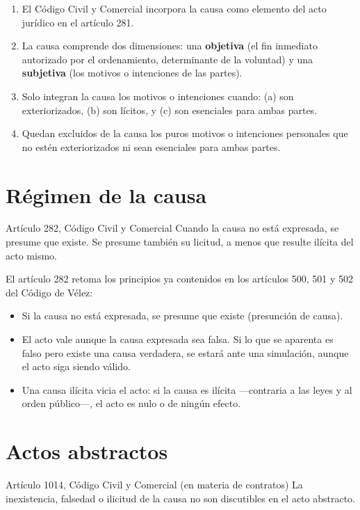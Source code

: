 \documentclass[12pt,oneside]{book}
\begin{document}
\begin{enumerate}
    \item El Código Civil y Comercial incorpora la causa como elemento del acto jurídico en el artículo 281.
    \item La causa comprende dos dimensiones: una \textbf{objetiva} (el fin inmediato autorizado por el ordenamiento, determinante de la voluntad) y una \textbf{subjetiva} (los motivos o intenciones de las partes).
    \item Solo integran la causa los motivos o intenciones cuando: (a) son exteriorizados, (b) son lícitos, y (c) son esenciales para ambas partes.
    \item Quedan excluidos de la causa los puros motivos o intenciones personales que no estén exteriorizados ni sean esenciales para ambas partes.
\end{enumerate}

\section{Régimen de la causa}

\begin{definition}{Artículo 282, Código Civil y Comercial}
Cuando la causa no está expresada, se presume que existe. Se presume también su licitud, a menos que resulte ilícita del acto mismo.
\end{definition}

El artículo 282 retoma los principios ya contenidos en los artículos 500, 501 y 502 del Código de Vélez:

\begin{itemize}
    \item Si la causa no está expresada, se presume que existe (presunción de causa).
    \item El acto vale aunque la causa expresada sea falsa. Si lo que se aparenta es falso pero existe una causa verdadera, se estará ante una simulación, aunque el acto siga siendo válido.
    \item Una causa ilícita vicia el acto: si la causa es ilícita —contraria a las leyes y al orden público—, el acto es nulo o de ningún efecto.
\end{itemize}

\section{Actos abstractos}

\begin{definition}{Artículo 1014, Código Civil y Comercial (en materia de contratos)}
La inexistencia, falsedad o ilicitud de la causa no son discutibles en el acto abstracto.
\end{definition}
\end{document}

